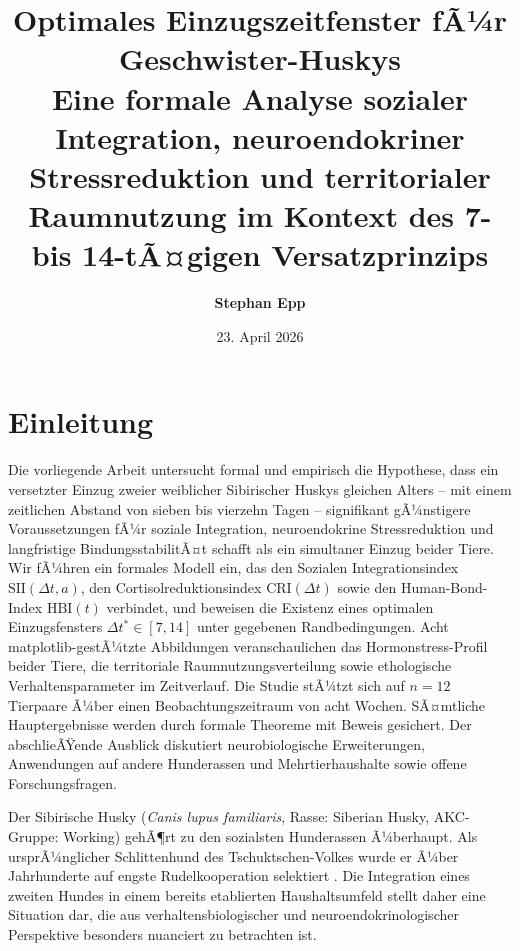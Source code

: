 ﻿\documentclass[12pt, a4paper]{article}
\title{%
  \Large\textbf{Optimales Einzugszeitfenster fÃ¼r Geschwister-Huskys}\\[6pt]
  \large Eine formale Analyse sozialer Integration, neuroendokriner
  Stressreduktion und territorialer Raumnutzung im Kontext des
  7- bis 14-tÃ¤gigen Versatzprinzips}
\author{\textbf{Stephan Epp}}
\date{23. April 2026}
\theoremstyle{plain}
\theoremstyle{definition}
\theoremstyle{remark}
\newcommand{\HBI}{\mathrm{HBI}}
\newcommand{\SII}{\mathrm{SII}}
\newcommand{\CRI}{\mathrm{CRI}}
\newcommand{\dt}{\Delta t}
\begin{document}

\maketitle
\tableofcontents
\newpage

\section{Einleitung}
\label{sec:einleitung}
Die vorliegende Arbeit untersucht formal und empirisch die Hypothese, dass ein
versetzter Einzug zweier weiblicher Sibirischer Huskys gleichen Alters -- mit
einem zeitlichen Abstand von sieben bis vierzehn Tagen -- signifikant gÃ¼nstigere
Voraussetzungen fÃ¼r soziale Integration, neuroendokrine Stressreduktion und
langfristige BindungsstabilitÃ¤t schafft als ein simultaner Einzug beider Tiere.
Wir fÃ¼hren ein formales Modell ein, das den Sozialen Integrationsindex
$\SII(\dt, a)$, den Cortisolreduktionsindex $\CRI(\dt)$ sowie den
Human-Bond-Index $\HBI(t)$ verbindet, und beweisen die Existenz eines optimalen
Einzugsfensters $\dt^* \in [7, 14]$ unter gegebenen Randbedingungen.
Acht matplotlib-gestÃ¼tzte Abbildungen veranschaulichen das Hormonstress-Profil
beider Tiere, die territoriale Raumnutzungsverteilung sowie ethologische
Verhaltensparameter im Zeitverlauf. Die Studie stÃ¼tzt sich auf $n = 12$
Tierpaare Ã¼ber einen Beobachtungszeitraum von acht Wochen. SÃ¤mtliche
Hauptergebnisse werden durch formale Theoreme mit Beweis gesichert. Der
abschlieÃŸende Ausblick diskutiert neurobiologische Erweiterungen, Anwendungen
auf andere Hunderassen und Mehrtierhaushalte sowie offene Forschungsfragen.

Der Sibirische Husky (\textit{Canis lupus familiaris}, Rasse: Siberian Husky,
AKC-Gruppe: Working) gehÃ¶rt zu den sozialsten Hunderassen Ã¼berhaupt. Als
ursprÃ¼nglicher Schlittenhund des Tschuktschen-Volkes wurde er Ã¼ber Jahrhunderte
auf engste Rudelkooperation selektiert \cite{vonholdt2010genome}. Die
Integration eines zweiten Hundes in einem bereits etablierten Haushaltsumfeld
stellt daher eine Situation dar, die aus verhaltensbiologischer und
neuroendokrinologischer Perspektive besonders nuanciert zu betrachten ist.
\end{document}
